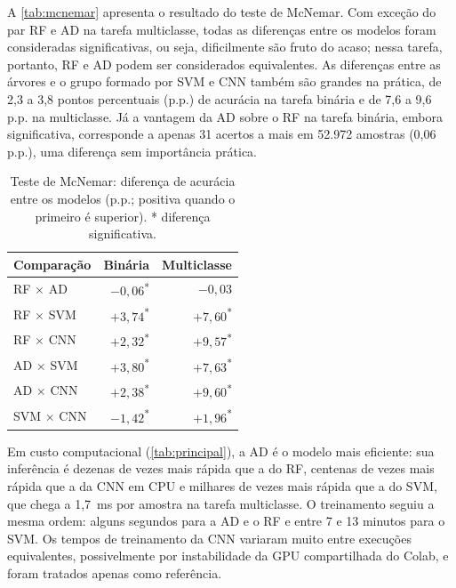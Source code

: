 \documentclass[alpha-refs,brazilian]{CC-EC_TF-TC}
\begin{document}
A \autoref{tab:mcnemar} apresenta o resultado do teste de McNemar. Com exceção do par RF e AD na tarefa multiclasse, todas as diferenças entre os modelos foram consideradas significativas, ou seja, dificilmente são fruto do acaso; nessa tarefa, portanto, RF e AD podem ser considerados equivalentes. As diferenças entre as árvores e o grupo formado por SVM e CNN também são grandes na prática, de 2,3 a 3,8 pontos percentuais (p.p.) de acurácia na tarefa binária e de 7,6 a 9,6 p.p. na multiclasse. Já a vantagem da AD sobre o RF na tarefa binária, embora significativa, corresponde a apenas 31 acertos a mais em 52.972 amostras (0,06 p.p.), uma diferença sem importância prática.

\begin{table}[htbp]
\centering
\caption{Teste de McNemar: diferença de acurácia entre os modelos (p.p.; positiva quando o primeiro é superior). * diferença significativa.}
\label{tab:mcnemar}
\small
\begin{tabular}{lrr}
\toprule
\textbf{Comparação} & \textbf{Binária} & \textbf{Multiclasse} \\
\midrule
RF $\times$ AD    & $-0{,}06$\textsuperscript{*} & $-0{,}03$ \\
RF $\times$ SVM   & $+3{,}74$\textsuperscript{*} & $+7{,}60$\textsuperscript{*} \\
RF $\times$ CNN   & $+2{,}32$\textsuperscript{*} & $+9{,}57$\textsuperscript{*} \\
AD $\times$ SVM   & $+3{,}80$\textsuperscript{*} & $+7{,}63$\textsuperscript{*} \\
AD $\times$ CNN   & $+2{,}38$\textsuperscript{*} & $+9{,}60$\textsuperscript{*} \\
SVM $\times$ CNN  & $-1{,}42$\textsuperscript{*} & $+1{,}96$\textsuperscript{*} \\
\bottomrule
\end{tabular}
\end{table}

Em custo computacional (\autoref{tab:principal}), a AD é o modelo mais eficiente: sua inferência é dezenas de vezes mais rápida que a do RF, centenas de vezes mais rápida que a da CNN em CPU e milhares de vezes mais rápida que a do SVM, que chega a 1,7~ms por amostra na tarefa multiclasse. O treinamento seguiu a mesma ordem: alguns segundos para a AD e o RF e entre 7 e 13 minutos para o SVM. Os tempos de treinamento da CNN variaram muito entre execuções equivalentes, possivelmente por instabilidade da GPU compartilhada do Colab, e foram tratados apenas como referência.
\end{document}

